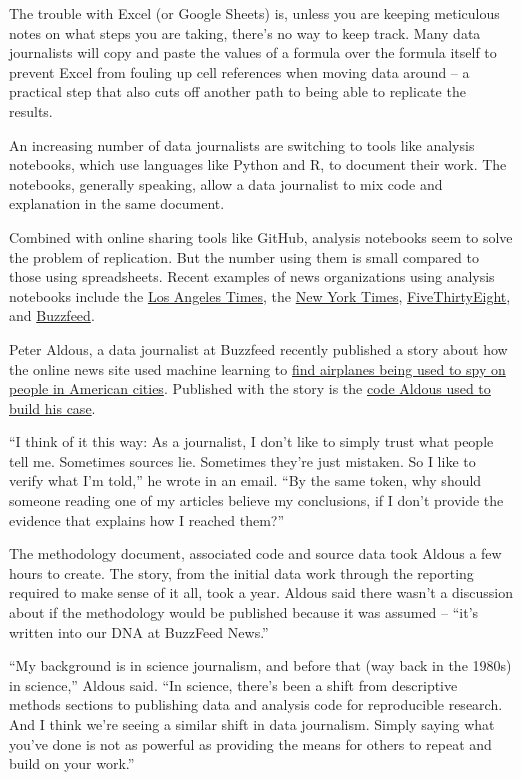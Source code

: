 \documentclass[
  letterpaper,
  DIV=11,
  numbers=noendperiod]{scrreprt}
\begin{document}
The trouble with Excel (or Google Sheets) is, unless you are keeping
meticulous notes on what steps you are taking, there's no way to keep
track. Many data journalists will copy and paste the values of a formula
over the formula itself to prevent Excel from fouling up cell references
when moving data around -- a practical step that also cuts off another
path to being able to replicate the results.

An increasing number of data journalists are switching to tools like
analysis notebooks, which use languages like Python and R, to document
their work. The notebooks, generally speaking, allow a data journalist
to mix code and explanation in the same document.

Combined with online sharing tools like GitHub, analysis notebooks seem
to solve the problem of replication. But the number using them is small
compared to those using spreadsheets. Recent examples of news
organizations using analysis notebooks include the
\href{https://github.com/datadesk}{Los Angeles Times}, the
\href{https://github.com/TheUpshot}{New York Times},
\href{https://github.com/fivethirtyeight/data}{FiveThirtyEight}, and
\href{https://github.com/BuzzFeedNews}{Buzzfeed}.

Peter Aldous, a data journalist at Buzzfeed recently published a story
about how the online news site used machine learning to
\href{https://www.buzzfeednews.com/article/peteraldhous/us-marshals-spy-plane-over-mexico\#.qqYnVj0B}{find
airplanes being used to spy on people in American cities}. Published
with the story is the
\href{https://github.com/BuzzFeedNews/2017-08-spy-plane-finder}{code
Aldous used to build his case}.

``I think of it this way: As a journalist, I don't like to simply trust
what people tell me. Sometimes sources lie. Sometimes they're just
mistaken. So I like to verify what I'm told,'' he wrote in an email.
``By the same token, why should someone reading one of my articles
believe my conclusions, if I don't provide the evidence that explains
how I reached them?''

The methodology document, associated code and source data took Aldous a
few hours to create. The story, from the initial data work through the
reporting required to make sense of it all, took a year. Aldous said
there wasn't a discussion about if the methodology would be published
because it was assumed -- ``it's written into our DNA at BuzzFeed
News.''

``My background is in science journalism, and before that (way back in
the 1980s) in science,'' Aldous said. ``In science, there's been a shift
from descriptive methods sections to publishing data and analysis code
for reproducible research. And I think we're seeing a similar shift in
data journalism. Simply saying what you've done is not as powerful as
providing the means for others to repeat and build on your work.''
\end{document}
